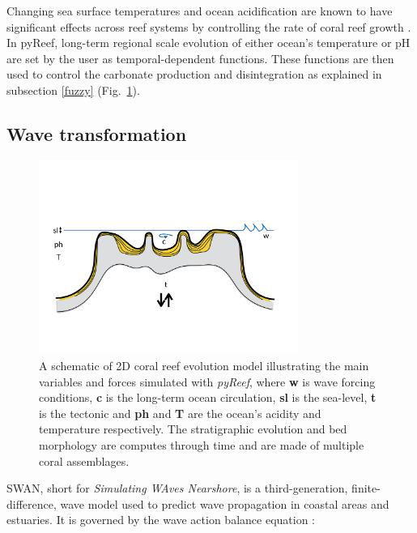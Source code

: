 \documentclass[default,jgrga]{agutex2015}
\begin{document}
\begin{article}
\noindent Changing sea surface temperatures and ocean acidification are known to have significant effects across reef systems by controlling the rate of coral reef growth \citep{Shaw12, Andersson13, Zhang13}. In pyReef, long-term regional scale evolution of either ocean's temperature or pH are set by the user as temporal-dependent functions. These functions are then used to control the carbonate production and disintegration as explained in subsection \ref{fuzzy} (Fig.~\ref{pyreef_sketch}).

\subsection{Wave transformation}

\begin{figure}[t]
\centering
\noindent\includegraphics[width=20pc]{figs/fig1.pdf}
\caption{A schematic of 2D coral reef evolution model illustrating the main variables and forces simulated with \textit{pyReef}, where \textbf{w} is wave forcing conditions, \textbf{c} is the long-term ocean circulation, \textbf{sl} is the sea-level, \textbf{t} is the tectonic and \textbf{ph} and \textbf{T} are the ocean's acidity and temperature respectively. The stratigraphic evolution and bed morphology are computes through time and are made of multiple coral assemblages.
}
\label{pyreef_sketch}
\end{figure}

SWAN, short for \textit{Simulating WAves Nearshore}, is a third-generation, finite-difference, wave model used to predict wave propagation in coastal areas and estuaries. It is governed by the wave action balance equation \citep{Bretherton68, Hasselmann73, Holthuijsen93, Booij99}:


\end{article}
\end{document}
